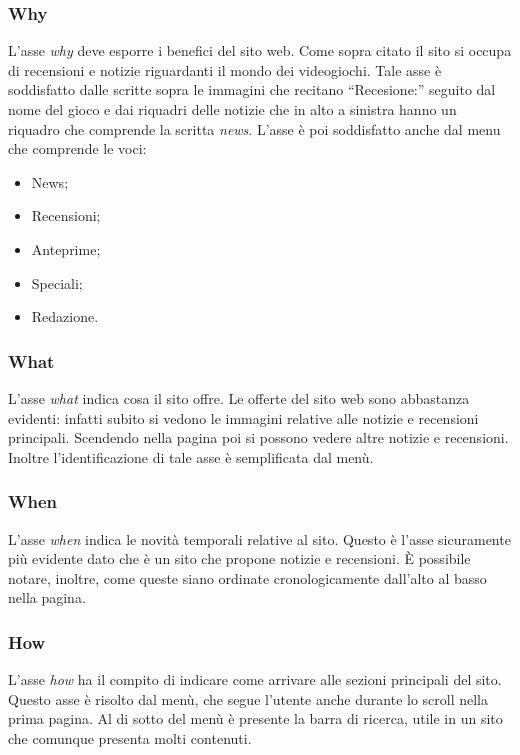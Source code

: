 \documentclass[../ProgettoTecWeb2.tex]{subfiles}
\begin{document}
		\subsubsection{Why}
			L'asse \textit{why} deve esporre i benefici del sito web. Come sopra citato il sito si occupa di recensioni e notizie riguardanti il mondo dei videogiochi. Tale asse è soddisfatto dalle scritte sopra le immagini che recitano ``Recesione:'' seguito dal nome del gioco e dai riquadri delle notizie che in alto a sinistra hanno un riquadro che comprende la scritta \textit{news}. L'asse è poi soddisfatto anche dal menu che comprende le voci:
			\begin{itemize}
				\item News;
				\item Recensioni;
				\item Anteprime;
				\item Speciali;
				\item Redazione.
			\end{itemize}
		\subsubsection{What}
			L'asse \textit{what} indica cosa il sito offre. Le offerte del sito web sono abbastanza evidenti: infatti subito si vedono le immagini relative alle notizie e recensioni principali. Scendendo nella pagina poi si possono vedere altre notizie e recensioni. Inoltre l'identificazione di tale asse è semplificata dal menù.
		\subsubsection{When}
			L'asse \textit{when} indica le novità temporali relative al sito. Questo è l'asse sicuramente più evidente dato che è un sito che propone notizie e recensioni. È possibile notare, inoltre, come queste siano ordinate cronologicamente dall'alto al basso nella pagina.
		\subsubsection{How}
			L'asse \textit{how} ha il compito di indicare come arrivare alle sezioni principali del sito. Questo asse è risolto dal menù, che segue l'utente anche durante lo scroll nella prima pagina. Al di sotto del menù è presente la barra di ricerca, utile in un sito che comunque presenta molti contenuti.
			
\end{document}
